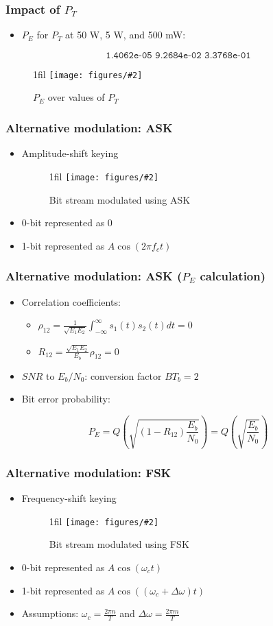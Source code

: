 \documentclass{beamer}
\makeatletter
\newcommand{\code}[1]{\texttt{#1}}
\newcommand*{\centerfloat}{%
  \parindent \z@
  \leftskip \z@ \@plus 1fil \@minus \textwidth
  \rightskip\leftskip
  \parfillskip \z@skip}
\newcommand{\fig}[3]{
  \begin{figure}[H]
  \centerfloat
    \texttt{[image: figures/\#2]}
	\caption{#3}
  \end{figure}
}
\makeatother
\begin{document}
\begin{frame}
	\frametitle{Impact of $P_T$}
	\begin{itemize}
		\item $P_E$ for $P_T$ at 50 W, 5 W, and 500 mW:
	\end{itemize}
	\begin{equation}
		\code{1.4062e-05   9.2684e-02   3.3768e-01}
	\end{equation}
	\fig{4cm}{pe_over_pt.png}{$P_E$ over values of $P_T$}
\end{frame}

\begin{frame}
	\frametitle{Alternative modulation: ASK}
	\begin{itemize}
		\item Amplitude-shift keying
		\fig{2.5cm}{ask.png}{Bit stream modulated using ASK}
		\item 0-bit represented as 0
		\item 1-bit represented as $A\cos(2 \pi f_c t)$
	\end{itemize}
\end{frame}

\begin{frame}
	\frametitle{Alternative modulation: ASK ($P_E$ calculation)}
	\begin{itemize}
		\item Correlation coefficients:
		\begin{itemize}
			\item $\rho_{12} = \frac{1}{\sqrt{E_1 E_2}} \int_{-\infty}^{\infty} s_1(t) s_2(t) dt = 0$
			\item $R_{12} = \frac{\sqrt{E_1 E_2}}{E_b}\rho_{12} = 0$
		\end{itemize}
		\item $SNR$ to $E_b/N_0$: conversion factor $B T_b = 2$
		\item Bit error probability:
	\end{itemize}
	\begin{equation}
		P_E = Q\left(\sqrt{\left(1 - R_{12}\right) \frac{E_b}{N_0}}\right) = Q\left(\sqrt{\frac{E_b}{N_0}}\right)
	\end{equation}
\end{frame}

\begin{frame}
	\frametitle{Alternative modulation: FSK}
	\begin{itemize}
		\item Frequency-shift keying
		\fig{2.5cm}{fsk.png}{Bit stream modulated using FSK}
		\item 0-bit represented as $A\cos(\omega_c t)$
		\item 1-bit represented as $A\cos((\omega_c + \Delta \omega) t)$
		\item Assumptions: $\omega_c = \frac{2 \pi n}{T}$ and $\Delta\omega = \frac{2 \pi m}{T}$
	\end{itemize}
\end{frame}
\end{document}
